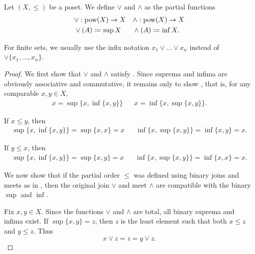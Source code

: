 \begin{definition}\label{def:join_meet}
  Let \( (X, \leq) \) be a poset. We define  \( \vee \) and  \( \wedge \) as the partial functions
  \begin{align*}
    &\vee: \operatorname{pow}(X) \to X
    &&\wedge: \operatorname{pow}(X) \to X
    \\
    &\vee(A) \coloneqq \sup X
    &&\wedge(A) \coloneqq \inf X.
  \end{align*}

  For finite sets, we usually use the infix notation \( x_1 \vee \ldots \vee x_n \) instead of \( \vee \{ x_1, \ldots, x_n \} \).
\end{definition}
\begin{proof}
  We first show that \( \vee \) and \( \wedge \) satisfy . Since suprema and infima are obviously associative and commutative, it remains only to show , that is, for any comparable \( x, y \in X \),
  \begin{align*}
    x = \sup \{x, \inf \{ x, y \} \}
    &&
    x = \inf \{x, \sup \{ x, y \} \}.
  \end{align*}

  If \( x \leq y \), then
  \begin{align*}
    \sup \{ x, \inf \{ x, y \} \} = \sup \{ x, x \} = x
    &&
    \inf \{ x, \sup \{ x, y \} \} = \inf \{ x, y \} = x.
  \end{align*}

  If \( y \leq x \), then
  \begin{align*}
    \sup \{ x, \inf \{ x, y \} \} = \sup \{ x, y \} = x
    &&
    \inf \{ x, \sup \{ x, y \} \} = \inf \{ x, x \} = x.
  \end{align*}

  We now show that if the partial order \( \leq \) was defined using binary joins and meets as in , then the original join \( \vee \) and meet \( \wedge \) are compatible with the binary \( \sup \) and \( \inf \).

  Fix \( x, y \in X \). Since the functions \( \vee \) and \( \wedge \) are total, all binary suprema and infima exist. If \( \sup \{ x, y \} = z \), then \( z \) is the least element such that both \( x \leq z \) and \( y \leq z \). Thus
  \begin{equation*}
    x \vee z = z = y \vee z.
  \end{equation*}


\end{proof}
